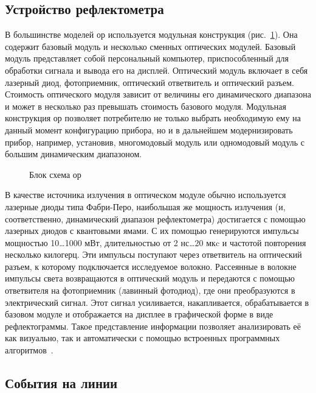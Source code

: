 \subsection{Устройство рефлектометра}

В большинстве моделей \acrshort{ор} используется модульная конструкция (рис.~\ref{ris:otdr_schematic}). Она содержит базовый модуль и несколько сменных оптических модулей. Базовый модуль представляет собой персональный компьютер, приспособленный для обработки сигнала и вывода его на дисплей. Оптический модуль включает в себя лазерный диод, фотоприемник, оптический ответвитель и оптический разъем. Стоимость оптического модуля зависит от величины его динамического диапазона и может в несколько раз превышать стоимость базового модуля. Модульная конструкция \acrshort{ор} позволяет потребителю не только выбрать необходимую ему на данный момент конфигурацию прибора, но и в дальнейшем модернизировать прибор, например, установив, многомодовый модуль или одномодовый модуль с большим динамическим диапазоном.

\begin{figure}[h]
  \caption{Блок схема \acrshort{ор}}
  \label{ris:otdr_schematic}
\end{figure}

В качестве источника излучения в оптическом модуле обычно используется лазерные диоды типа Фабри-Перо, наибольшая же мощность излучения (и, соответственно, динамический диапазон рефлектометра) достигается с помощью лазерных диодов с квантовыми ямами. С их помощью генерируются импульсы мощностью 10\dots1000 мВт, длительностью от 2 нс\dots20 мкc и частотой повторения несколько килогерц. Эти импульсы поступают через ответвитель на оптический разъем, к которому подключается исследуемое волокно. Рассеянные в волокне импульсы света возвращаются в оптический модуль и передаются с помощью ответвителя на фотоприемник (лавинный фотодиод), где они преобразуются в электрический сигнал. Этот сигнал усиливается, накапливается, обрабатывается в базовом модуле и отображается на дисплее в графической форме в виде рефлектограммы. Такое представление информации позволяет анализировать её как визуально, так и автоматически с помощью встроенных программных алгоритмов~\cite{listvin:reflectometria}.

\subsection{События на линии}

